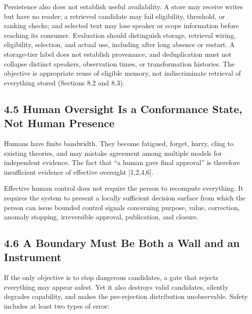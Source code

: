 Persistence also does not establish useful availability. A store may receive writes but have no reader; a retrieved candidate may fail eligibility, threshold, or ranking checks; and selected text may lose speaker or scope information before reaching its consumer. Evaluation should distinguish storage, retrieval wiring, eligibility, selection, and actual use, including after long absence or restart. A storage-tier label does not establish provenance, and deduplication must not collapse distinct speakers, observation times, or transformation histories. The objective is appropriate reuse of eligible memory, not indiscriminate retrieval of everything stored (Sections 8.2 and 8.3).

\subsection{4.5 Human Oversight Is a Conformance State, Not Human Presence}\label{human-oversight-is-a-conformance-state-not-human-presence}

Humans have finite bandwidth. They become fatigued, forget, hurry, cling to existing theories, and may mistake agreement among multiple models for independent evidence. The fact that ``a human gave final approval'' is therefore insufficient evidence of effective oversight {[}1,2,4,6{]}.

Effective human control does not require the person to recompute everything. It requires the system to present a locally sufficient decision surface from which the person can issue bounded control signals concerning purpose, value, correction, anomaly stopping, irreversible approval, publication, and closure.

\subsection{4.6 A Boundary Must Be Both a Wall and an Instrument}\label{a-boundary-must-be-both-a-wall-and-an-instrument}

If the only objective is to stop dangerous candidates, a gate that rejects everything may appear safest. Yet it also destroys valid candidates, silently degrades capability, and makes the pre-rejection distribution unobservable. Safety includes at least two types of error:

